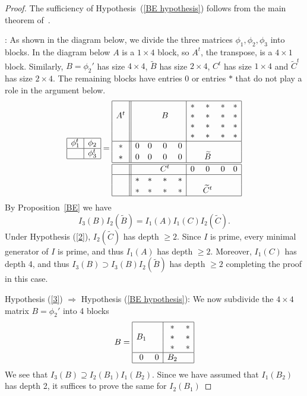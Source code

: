 \documentclass[twoside,12pt, leqno]{amsart}
\theoremstyle{definition}
\begin{document}
\begin{proof}
The sufficiency of Hypothesis~(\ref{BE hypothesis}) follows from the main theorem of~\cite{MR314819}.

:   
As shown in the diagram below, we divide the three matrices 
 $\phi_{1},\phi_{2}, \phi_{3}$ into blocks. In the diagram below $A$ is a $1\times 4$ block, so $A^t$, the transpose, is a $4\times 1$ block.
 Similarly, $B = \phi_2'$ has size $4\times 4$, $\widetilde B$ has size $2\times 4$, $C^t$ has size $1\times 4$ and $\widetilde C^t$ has size $2\times 4$.
 The remaining blocks have entries 0 or entries $*$ that do not play a role in the argument below.
  $$ 
  \begin{array}{|c|c|} \hline
               \phi_{1}^{t}& \phi_{2} \cr \hline
                                 & \phi_{3}^{t} \cr \hline
       \end{array} =
\begin{array}{|c||cccc| cccc|}\hline
  
          &&&&&*&*&*&*\cr        
          A^t&&&B&&*&*&*&*\cr        
          &&&&&*&*&*&*\cr        
          &&&&&*&*&*&*\cr\hline
         *               & {0}&0&0&0&&&&\cr
       *                    & {0}&0&0&0&&\widetilde B&&\cr\hline\hline
                                                          & &&C^t&&0&0&0&0\cr\hline
                                                         
                                                          &*&*&*&*&&&&\cr
                                                          &*&*&*&*&&\widetilde C^t&&\cr\hline
                                                          \end{array} $$
By Proposition~\ref{BE} we have
$$
I_3(B)I_2(\widetilde B) = I_1(A)I_1(C)I_2(\widetilde C).
$$
Under Hypothesis (\ref{2}), $I_2(\widetilde C)$ has depth $\geq 2$. Since $I$ is prime, every minimal generator of $I$ is prime, and thus $I_1(A)$
has depth $\geq 2$. Moreover, $I_1(C)$ has depth 4, and thus $I_3(B)\supset I_3(B)I_2(\widetilde B) $ has depth $\geq 2$
completing the proof in this case.
 \smallbreak
 
 \noindent Hypothesis (\ref{3}) $\Rightarrow$ Hypothesis (\ref{BE hypothesis}):   We now subdivide the $4\times 4$ matrix $B = \phi_2'$ into 4 blocks
 $$
 B = \begin{array}{|cc|cc|} \hline
               &&*&* \cr 
              B_1&&*&* \cr 
              &&*&* \cr\hline
               0&0&B_2&\cr\hline
       \end{array} 
       $$
 We see that $I_3(B) \supseteq I_2(B_1)I_1(B_2)$. Since we have assumed that $I_1(B_2)$ has depth 2, it suffices to
 prove the same for $I_2(B_1)$


\end{proof}
\end{document}

